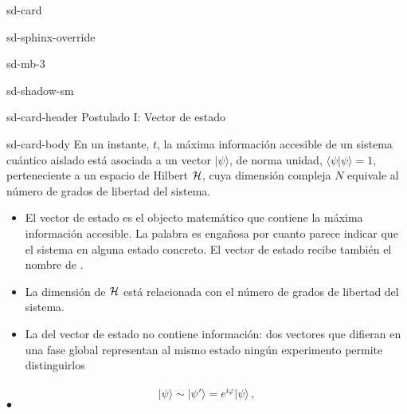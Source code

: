 \documentclass[letterpaper,10pt,english]{jupyterBook}
\newcommand{\ket}[1]{|#1\rangle}
\newcommand{\braket}[2]{\langle #1|#2\rangle}
\newcommand{\Hil}{{\cal H}}
\begin{document}
\sphinxAtStartPar


\begin{sphinxuseclass}{sd-card}
\begin{sphinxuseclass}{sd-sphinx-override}
\begin{sphinxuseclass}{sd-mb-3}
\begin{sphinxuseclass}{sd-shadow-sm}
\begin{sphinxuseclass}{sd-card-header}
\sphinxAtStartPar
Postulado I: Vector de estado

\end{sphinxuseclass}
\begin{sphinxuseclass}{sd-card-body}
\sphinxAtStartPar
En un instante, \(t\), la máxima información accesible de un sistema cuántico aislado está asociada a un vector \(\ket{\psi}\), de norma unidad, \(\braket{\psi}{\psi}=1\), perteneciente a un espacio de Hilbert \(\Hil\), cuya dimensión compleja \(N\) equivale al número de grados de libertad del sistema.

\end{sphinxuseclass}
\end{sphinxuseclass}
\end{sphinxuseclass}
\end{sphinxuseclass}
\end{sphinxuseclass}\begin{itemize}
\item {} 
\sphinxAtStartPar
El vector de estado es el objecto matemático que contiene la máxima información accesible. La palabra  es engañosa por cuanto parece indicar que el sistema  en alguna estado concreto.  El vector de estado recibe también el nombre de .

\item {} 
\sphinxAtStartPar
La dimensión de \(\Hil\) está relacionada con el número de grados de libertad del sistema.

\item {} 
\sphinxAtStartPar
La  del vector de estado no contiene información: dos vectores que difieran en una fase global representan al mismo estado ningún experimento permite distinguirlos

\end{itemize}
\begin{equation*}
\begin{split}
\ket{\psi} \sim \ket{\psi'} =  e^{i\varphi}\ket{\psi} \, ,
\end{split}
\end{equation*}
\sphinxAtStartPar
\(\bullet\) 
\end{document}
